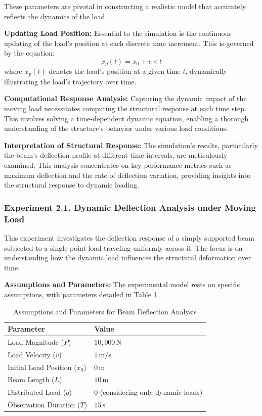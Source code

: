 \documentclass[conference]{IEEEtran}
\begin{document}
These parameters are pivotal in constructing a realistic model that accurately reflects the dynamics of the load.

\textbf{Updating Load Position:} Essential to the simulation is the continuous updating of the load's position at each discrete time increment. This is governed by the equation:
\begin{equation}
x_p(t) = x_0 + v \times t
\end{equation}
where \( x_p(t) \) denotes the load's position at a given time \( t \), dynamically illustrating the load’s trajectory over time.

\textbf{Computational Response Analysis:} Capturing the dynamic impact of the moving load necessitates computing the structural response at each time step. This involves solving a time-dependent dynamic equation, enabling a thorough understanding of the structure's behavior under various load conditions.

\textbf{Interpretation of Structural Response:} The simulation's results, particularly the beam's deflection profile at different time intervals, are meticulously examined. This analysis concentrates on key performance metrics such as maximum deflection and the rate of deflection variation, providing insights into the structural response to dynamic loading.


\subsubsection{Experiment 2.1. Dynamic Deflection Analysis under Moving Load}

This experiment investigates the deflection response of a simply supported beam subjected to a single-point load traveling uniformly across it. The focus is on understanding how the dynamic load influences the structural deformation over time.

\textbf{Assumptions and Parameters:} The experimental model rests on specific assumptions, with parameters detailed in Table \ref{tab3}.

\begin{table}[ht]
\centering
\caption{Assumptions and Parameters for Beam Deflection Analysis}
\label{tab3}
\begin{tabular}{l l}
\hline
\textbf{Parameter} & \textbf{Value} \\
\hline
Load Magnitude (\( P \)) & \( 10,000\,\text{N} \) \\
Load Velocity (\( v \)) & \( 1\,\text{m/s} \) \\
Initial Load Position (\( x_0 \)) & \( 0\,\text{m} \) \\
Beam Length (\( L \)) & \( 10\,\text{m} \) \\
Distributed Load (\( q \)) & \( 0 \) (considering only dynamic loads) \\
Observation Duration (\( T \)) & \( 15\,\text{s} \) \\
\hline
\end{tabular}
\end{table}
\end{document}
